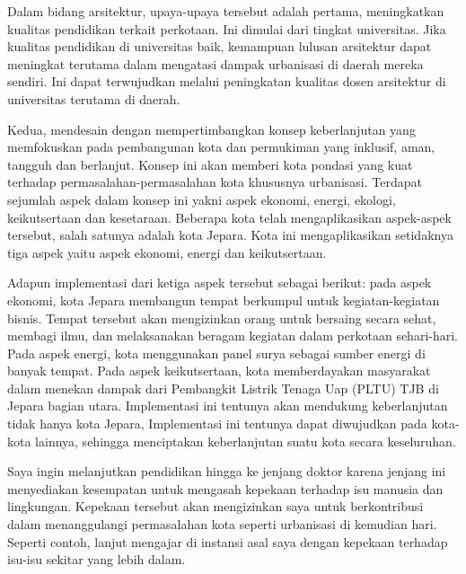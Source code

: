 \documentclass[../main.tex]{subfiles}
\begin{document}



Dalam bidang arsitektur, upaya-upaya tersebut adalah pertama, meningkatkan kualitas pendidikan terkait perkotaan. Ini dimulai dari tingkat universitas.
Jika kualitas pendidikan di universitas baik,  kemampuan lulusan arsitektur dapat meningkat terutama dalam mengatasi dampak urbanisasi di daerah mereka sendiri. Ini dapat terwujudkan melalui peningkatan kualitas dosen arsitektur di universitas terutama di daerah.

Kedua, mendesain dengan mempertimbangkan  konsep keberlanjutan yang memfokuskan pada pembangunan kota dan permukiman yang inklusif, aman, tangguh dan berlanjut.
Konsep ini akan memberi kota pondasi yang kuat terhadap permasalahan-permasalahan kota khususnya urbanisasi.
Terdapat sejumlah aspek dalam konsep ini yakni aspek ekonomi, energi, ekologi, keikutsertaan dan kesetaraan. Beberapa kota telah mengaplikasikan aspek-aspek tersebut, salah satunya adalah kota Jepara. Kota ini mengaplikasikan setidaknya tiga aspek yaitu aspek ekonomi, energi dan keikutsertaan.

Adapun implementasi dari ketiga aspek tersebut sebagai berikut: pada aspek ekonomi, kota Jepara membangun tempat berkumpul untuk kegiatan-kegiatan bisnis. Tempat tersebut akan mengizinkan orang untuk bersaing secara sehat, membagi ilmu, dan melaksanakan beragam kegiatan dalam perkotaan sehari-hari.
Pada aspek energi, kota menggunakan panel surya sebagai sumber energi di banyak tempat.
Pada aspek keikutsertaan, kota memberdayakan masyarakat dalam menekan dampak dari Pembangkit Listrik Tenaga Uap (PLTU) TJB di Jepara bagian utara.
Implementasi ini tentunya akan mendukung keberlanjutan tidak hanya kota Jepara,
Implementasi ini tentunya dapat diwujudkan pada kota-kota lainnya, sehingga menciptakan keberlanjutan suatu kota secara keseluruhan.

Saya ingin melanjutkan pendidikan hingga ke jenjang doktor karena jenjang ini menyediakan kesempatan untuk mengasah kepekaan terhadap isu manusia dan lingkungan.
Kepekaan tersebut akan mengizinkan saya untuk berkontribusi dalam menanggulangi permasalahan kota seperti urbanisasi di kemudian hari.
Seperti contoh, lanjut mengajar di instansi asal saya dengan kepekaan terhadap isu-isu sekitar yang lebih dalam.
\end{document}
